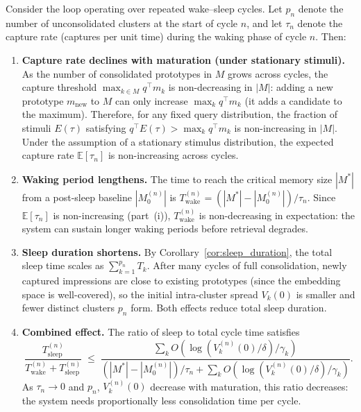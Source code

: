 \begin{corollary}
\label{cor:maturation}
\leanok
{}
Consider the loop operating over repeated wake--sleep cycles.  Let $p_n$ denote the number of unconsolidated clusters at the start of cycle $n$, and let $\tau_n$ denote the capture rate (captures per unit time) during the waking phase of cycle $n$.  Then:
\begin{enumerate}
\item \textbf{Capture rate declines with maturation (under stationary stimuli).}  As the number of consolidated prototypes in $M$ grows across cycles, the capture threshold $\max_{k \in M} q^\top m_k$ is non-decreasing in $|M|$: adding a new prototype $m_{\mathrm{new}}$ to $M$ can only increase $\max_k q^\top m_k$ (it adds a candidate to the maximum).  Therefore, for any fixed query distribution, the fraction of stimuli $E(\tau)$ satisfying $q^\top E(\tau) > \max_k q^\top m_k$ is non-increasing in $|M|$.  Under the assumption of a stationary stimulus distribution, the expected capture rate $\mathbb{E}[\tau_n]$ is non-increasing across cycles.
\item \textbf{Waking period lengthens.}  The time to reach the critical memory size $|M^*|$ from a post-sleep baseline $|M_0^{(n)}|$ is $T_{\mathrm{wake}}^{(n)} = (|M^*| - |M_0^{(n)}|)/\tau_n$.  Since $\mathbb{E}[\tau_n]$ is non-increasing (part~(i)), $T_{\mathrm{wake}}^{(n)}$ is non-decreasing in expectation: the system can sustain longer waking periods before retrieval degrades.
\item \textbf{Sleep duration shortens.}  By Corollary~\ref{cor:sleep_duration}, the total sleep time scales as $\sum_{k=1}^{p_n} T_k$.  After many cycles of full consolidation, newly captured impressions are close to existing prototypes (since the embedding space is well-covered), so the initial intra-cluster spread $V_k(0)$ is smaller and fewer distinct clusters $p_n$ form.  Both effects reduce total sleep duration.
\item \textbf{Combined effect.}  The ratio of sleep to total cycle time satisfies
\[
\frac{T_{\mathrm{sleep}}^{(n)}}{T_{\mathrm{wake}}^{(n)} + T_{\mathrm{sleep}}^{(n)}} \;\leq\; \frac{\sum_k O(\log(V_k^{(n)}(0)/\delta)/\gamma_k)}{(|M^*| - |M_0^{(n)}|)/\tau_n + \sum_k O(\log(V_k^{(n)}(0)/\delta)/\gamma_k)}.
\]
As $\tau_n \to 0$ and $p_n$, $V_k^{(n)}(0)$ decrease with maturation, this ratio decreases: the system needs proportionally less consolidation time per cycle.
\end{enumerate}
\end{corollary}


